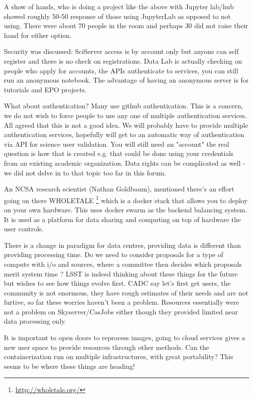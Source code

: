 \documentclass[11pt,twoside]{article}
\begin{document}
A show of hands, who is doing a project like the above with Jupyter lab/hub showed roughly 50-50 response of those using JupyterLab as opposed to not using. There were about 70 people in the room and perhaps 30 did not raise their hand for either option.

Security was discussed:
SciServer access is by account only but anyone can self register and there is no check on registrations.
Data Lab  is actually checking on people who apply for accounts, the APIs authenticate to services, you can still run an anonymous notebook. The advantage of having an anonymous server is for tutorials and EPO projects.

What about authentication? Many use github authentication. This is a concern, we do not wish to  force people to use any one of multiple authentication services. All agreed that this is not a good idea.
We will probably have to provide multiple authentication services, hopefully will get to an automatic way of authentication via API for science user validation.
You will still need an "account" the real question is how that is created e.g. that could be done using your credentials from an existing academic organization.
Data rights can be complicated as well - we did not delve in to that topic too far in this forum.


An NCSA research scientist (Nathan Goldbaum), mentioned there's an effort going on there WHOLETALE \footnote{\url{http://wholetale.org/}}  which is a docker stack that allows you to deploy on your own hardware. This uses docker swarm as the backend balancing system. It is used as a platform for data sharing and computing on top of hardware the user controls.

There is a change in paradigm for data centres, providing data is different than providing processing time.
Do we need to consider proposals for  a type of compute with i/o and sources, where  a committee then decides which proposals merit system time ?
	 LSST is indeed thinking about these things for the future but wishes to see how things evolve first.
	 CADC say let's first get users, the community is not enormous, they have rough estimates of their needs and are not furtive, so far these worries haven't been a problem. Resources essentially were not a problem on Skyserver/CasJobs either though they provided limited near data processing only.

It is important to open doors to reprocess images, going to cloud services gives a new user space to provide resources through other methods. Can the containerization run on multiple infrastructures, with great portability?
This seems to be where these things are heading!
\end{document}

